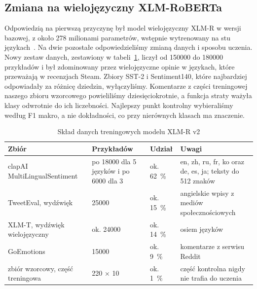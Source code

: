 \subsection{Zmiana na wielojęzyczny XLM-RoBERTa}
\label{sec:impl-xlmr}

Odpowiedzią na pierwszą przyczynę był model wielojęzyczny XLM-R w wersji bazowej, z około 278 milionami parametrów, wstępnie wytrenowany na stu językach~\cite{conneau2020unsupervised}.
Na dwie pozostałe odpowiedzieliśmy zmianą danych i sposobu uczenia.
Nowy zestaw danych, zestawiony w tabeli~\ref{tab:xlmr-corpus}, liczył od \num{150000} do \num{180000} przykładów i był zdominowany przez wielojęzyczne opinie w językach, które przeważają w recenzjach Steam.
Zbiory SST-2 i Sentiment140, które najbardziej odpowiadały za różnicę dziedzin, wyłączyliśmy.
Komentarze z części treningowej naszego zbioru wzorcowego powieliliśmy dziesięciokrotnie, a funkcja straty ważyła klasy odwrotnie do ich liczebności.
Najlepszy punkt kontrolny wybieraliśmy według F1 makro, a nie dokładności, co przy nierównych klasach ma znaczenie.

\begin{table}[hbp]
  \caption{Skład danych treningowych modelu XLM-R v2}
  \label{tab:xlmr-corpus}
  \centering
  \small
  \begin{tabular}{|p{}|p{}|p{}|p{}|}
    \hline
    Zbiór                                         & Przykładów           & Udział            & Uwagi                                              \\
    \hline
    clapAI MultiLingualSentiment~\cite{clapaimultilingualsentiment} & po \num{18000} dla 5 języków i po \num{6000} dla 3 & ok. \qty{62}{\percent} & en, zh, ru, fr, ko oraz de, es, ja; teksty do 512 znaków \\
    \hline
    TweetEval, wydźwięk~\cite{barbieri2020tweeteval} & \num{25000}       & ok. \qty{15}{\percent} & angielskie wpisy z mediów społecznościowych   \\
    \hline
    XLM-T, wydźwięk wielojęzyczny~\cite{barbieri2022xlmt} & ok. \num{24000} & ok. \qty{14}{\percent} & osiem języków                            \\
    \hline
    GoEmotions~\cite{demszky2020goemotions}       & \num{15000}          & ok. \qty{9}{\percent}  & komentarze z serwisu Reddit                  \\
    \hline
    zbiór wzorcowy, część treningowa              & 220 × 10             & ok. \qty{1}{\percent}  & część kontrolna nigdy nie trafia do uczenia  \\
    \hline
  \end{tabular}
\end{table}

